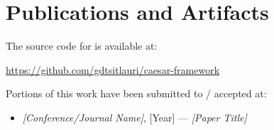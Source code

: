 \section{Publications and Artifacts}

The source code for \caesar{} is available at:
\begin{center}
  \url{https://github.com/gdtsitlauri/caesar-framework}
\end{center}

Portions of this work have been submitted to / accepted at:
\begin{itemize}
  \item \textit{[Conference/Journal Name]}, [Year] — \textit{[Paper Title]}
\end{itemize}

